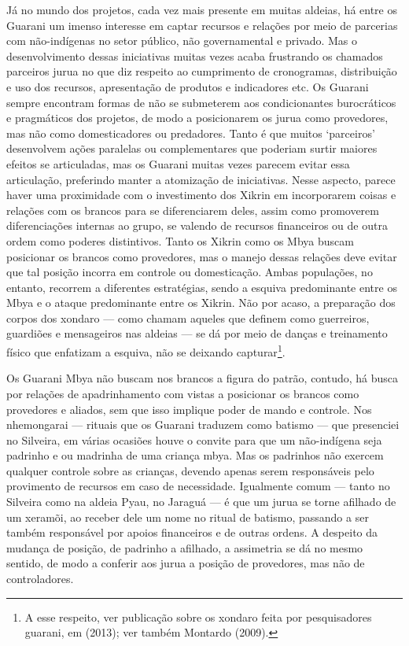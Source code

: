 Já no mundo dos projetos, cada vez mais presente em muitas aldeias, há
entre os Guarani um imenso interesse em captar recursos e relações por
meio de parcerias com não-indígenas no setor público, não governamental
e privado. Mas o desenvolvimento dessas iniciativas muitas vezes acaba
frustrando os chamados parceiros jurua no que diz respeito ao
cumprimento de cronogramas, distribuição e uso dos recursos,
apresentação de produtos e indicadores etc. Os Guarani sempre encontram
formas de não se submeterem aos condicionantes burocráticos e
pragmáticos dos projetos, de modo a posicionarem os jurua como
provedores, mas não como domesticadores ou predadores. Tanto é que
muitos ‘parceiros’ desenvolvem ações paralelas ou complementares que
poderiam surtir maiores efeitos se articuladas, mas os Guarani muitas
vezes parecem evitar essa articulação, preferindo manter a atomização
de iniciativas. Nesse aspecto, parece haver uma proximidade com o
investimento dos Xikrin em incorporarem coisas e relações com os
brancos para se diferenciarem deles, assim como promoverem
diferenciações internas ao grupo, se valendo de recursos financeiros ou
de outra ordem como poderes distintivos. Tanto os Xikrin como os Mbya
buscam posicionar os brancos como provedores, mas o manejo dessas
relações deve evitar que tal posição incorra em controle ou
domesticação. Ambas populações, no entanto, recorrem a diferentes
estratégias, sendo a esquiva predominante entre os Mbya e o ataque
predominante entre os Xikrin. Não por acaso, a preparação dos corpos
dos xondaro --- como chamam aqueles que definem como guerreiros,
guardiões e mensageiros nas aldeias --- se dá por meio de danças e
treinamento físico que enfatizam a esquiva, não se deixando
capturar\footnote{A esse respeito, ver publicação sobre os xondaro
feita por pesquisadores guarani, em  (2013); ver também Montardo
(2009).}.

Os Guarani Mbya não buscam nos brancos a figura do patrão, contudo, há
busca por relações de apadrinhamento com vistas a posicionar os brancos
como provedores e aliados, sem que isso implique poder de mando e
controle. Nos nhemongarai --- rituais que os Guarani traduzem como
batismo --- que presenciei no Silveira, em várias ocasiões houve o
convite para que um não-indígena seja padrinho e ou madrinha de uma
criança mbya. Mas os padrinhos não exercem qualquer controle sobre as
crianças, devendo apenas serem responsáveis pelo provimento de recursos
em caso de necessidade. Igualmente comum --- tanto no Silveira como na
aldeia Pyau, no Jaraguá --- é que um jurua se torne afilhado de um
xeramõi, ao receber dele um nome no ritual de batismo, passando a ser
também responsável por apoios financeiros e de outras ordens. A
despeito da mudança de posição, de padrinho a afilhado, a assimetria se
dá no mesmo sentido, de modo a conferir aos jurua a posição de
provedores, mas não de controladores.

